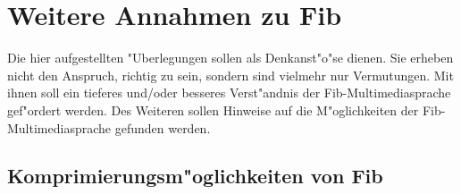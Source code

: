%
%
%
%

\graphicspath{{./beispiele/}}
\graphicspath{{./beispiele/}{../beispiele}}


\section{Weitere Annahmen zu Fib}
\label{secHypothesisFib}

Die hier aufgestellten "Uberlegungen sollen als Denkanst"o"se dienen. Sie erheben nicht den Anspruch, richtig zu sein, sondern sind vielmehr nur Vermutungen. Mit ihnen soll ein tieferes und/oder besseres Verst"andnis der Fib-Multimediasprache gef"ordert werden. Des Weiteren sollen Hinweise auf die M"oglichkeiten der Fib-Multimediasprache gefunden werden.


\subsection{Komprimierungsm"oglichkeiten von Fib}

